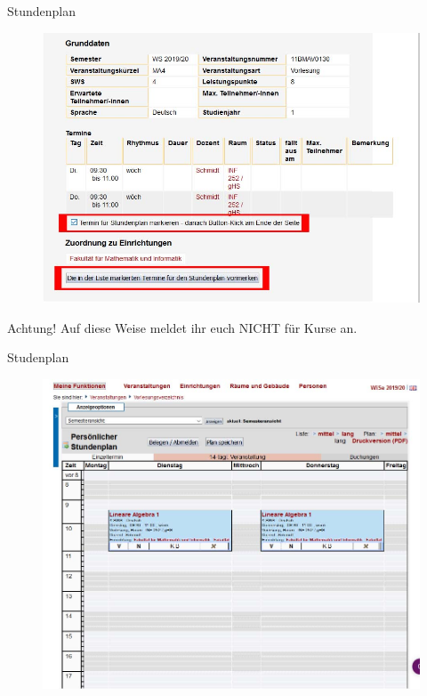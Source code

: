 \begin{frame}{Stundenplan}
    \begin{figure}
        \centering
        \includegraphics[scale=0.3]{images/lsf14.jpg}
    \end{figure}
    Achtung! Auf diese Weise meldet ihr euch NICHT für Kurse an.
\end{frame}

\begin{frame}{Studenplan}
    \begin{figure}
        \centering
        \includegraphics[scale=0.25]{images/lsf15.jpg}
    \end{figure}
\end{frame}

